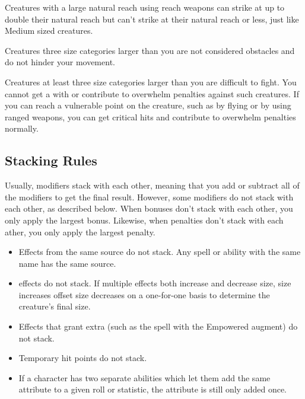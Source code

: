            Creatures with a large natural reach using reach weapons can strike at up to double their natural reach but can't strike at their natural reach or less, just like Medium sized creatures.

             Creatures three size categories larger than you are not considered obstacles and do not hinder your movement.

             Creatures at least three size categories larger than you are difficult to fight. You cannot get a  with  or contribute to overwhelm penalties against such creatures. If you can reach a vulnerable point on the creature, such as by flying or by using ranged weapons, you can get critical hits and contribute to overwhelm penalties normally.

    \subsection{Stacking Rules}\label{Stacking Rules}
        Usually, modifiers stack with each other, meaning that you add or subtract all of the modifiers to get the final result. However, some modifiers do not stack with each other, as described below. When bonuses don't stack with each other, you only apply the largest bonus. Likewise, when penalties don't stack with each ather, you only apply the largest penalty.


        \begin{itemize}
            \item Effects from the same source do not stack. Any spell or ability with the same name has the same source.
            \item {} effects do not stack.
                If multiple effects both increase and decrease size, size increases offset size decreases on a one-for-one basis to determine the creature's final size.
            \item Effects that grant extra  (such as the  spell with the Empowered augment) do not stack.
            \item Temporary hit points do not stack.
            \item If a character has two separate abilities which let them add the same attribute to a given roll or statistic, the attribute is still only added once.
        \end{itemize}

